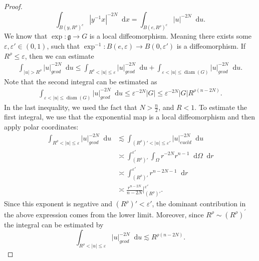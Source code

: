 \documentclass[12pt, reqno]{amsart}
\theoremstyle{definition}
\theoremstyle{remark}
\numberwithin{equation}{section}
\newcommand*\diff{\mathop{}\!\mathrm{d}}
\begin{document}
\begin{proof}
  \begin{equation*}
      \int_{B(y,R^\rho)^c}|y^{-1}x|^{-2N}\diff{x}=\int_{B(e,R^\rho)^c}|u|^{-2N}\diff{u}.
  \end{equation*}
  We know that $\exp\colon\mathfrak{g}\to G$ is a local diffeomorphism. Meaning there exists some $\varepsilon,\varepsilon'\in(0,1)$, such that $\exp^{-1}\colon B(e,\varepsilon)\to B(0,\varepsilon')$ is a diffeomorphism. 
  If $R^\rho\leq \varepsilon$, then we can estimate
  \begin{equation*}
   \begin{aligned}
       \int_{|u|>R^\rho}|u|^{-2N}_{geod}\diff{u}\leq\int_{R^\rho<|u|\leq\varepsilon}|u|^{-2N}_{geod}\diff{u}+\int_{\varepsilon<|u|\leq\operatorname{diam}(G)}|u|^{-2N}_{geod}\diff{u}.
   \end{aligned}
  \end{equation*}
 Note that the second integral can be estimated as
  \begin{equation*}
      \begin{aligned}
          \int_{\varepsilon<|u|\leq\operatorname{diam}(G)}|u|^{-2N}_{geod}\diff{u}\leq \varepsilon^{-2N}|G|\leq\varepsilon^{-2N}|G|R^{\rho(n-2N)}.
      \end{aligned}
  \end{equation*}
In the last inequality, we used the fact that $N>\frac{n}{2}$, and $R<1$.  To estimate the first integral, we use that the exponential map is a local diffeomorphism and then apply polar coordinates:
 \begin{equation*}
   \begin{aligned}
       \int_{R^{\rho}<|u|\leq\varepsilon}|u|^{-2N}_{geod}\diff{u}&\lesssim\int_{(R^\rho)'<|u|\leq\varepsilon'}|u|^{-2N}_{eucld}\diff{u}\\
       &\asymp
\int_{(R^\rho)'}^{\varepsilon'}\int_{\Omega}r^{-2N}r^{n-1}\diff{\Omega}\diff{r}\\
      &\asymp\int_{(R^\rho)'}^{\varepsilon'}r^{n-2N-1}\diff{r}\\
      &\asymp\frac{r^{n-2N}}{n-2N}\Big|_{(R^\rho)'}^{\varepsilon'}.
   \end{aligned}
  \end{equation*}
   Since this exponent is negative and $(R^{\rho})'<\varepsilon'$, the dominant contribution in the above expression comes from the lower limit. Moreover, since $R^\rho\sim(R^\rho)^{\prime}$ the integral can be estimated by
   \begin{equation*}
       \int_{R^\rho<|u|\leq\varepsilon}|u|^{-2N}_{geod}\diff{u}\lesssim R^{\rho(n-2N)}.

\end{equation*}
\end{proof}
\end{document}
